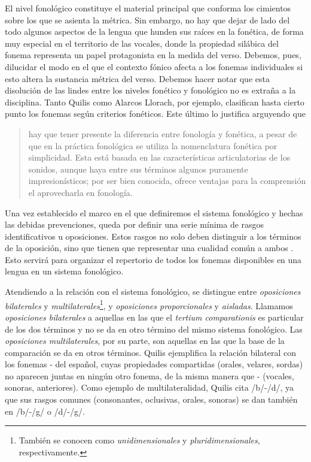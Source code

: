 El nivel fonológico constituye el material principal que conforma  los cimientos sobre los que se asienta la métrica. Sin embargo, no hay que dejar de lado del todo algunos aspectos de la lengua que hunden sus raíces en la fonética, de forma muy especial en el territorio de las vocales, donde la propiedad silábica del fonema representa un papel protagonista en la medida del verso. Debemos, pues, dilucidar el modo en el que el contexto fónico afecta a los fonemas individuales si esto altera la sustancia métrica del verso. Debemos hacer notar que esta disolución de las lindes entre los niveles fonético y fonológico no es extraña a la disciplina. Tanto Quilis \parencite*{quilis2019} como Alarcos Llorach, por ejemplo, clasifican hasta cierto punto los fonemas según criterios fonéticos.  Este último lo justifica arguyendo que \blockquote[{\cite[54]{alarcos1964}}]{hay que tener presente la diferencia entre fonología y fonética, a pesar de que en la práctica fonológica se utiliza la nomenclatura fonética por simplicidad. Esta está basada en las características articulatorias de los sonidos, aunque haya entre sus términos algunos puramente impresionísticos; por ser bien conocida, ofrece ventajas para la comprensión el aprovecharla en fonología.}

Una vez establecido el marco en el que definiremos el sistema fonológico y hechas las debidas prevenciones, queda por definir una serie mínima de rasgos identificativos u oposiciones. Estos rasgos no solo deben distinguir a los términos de la oposición, sino que tienen que representar una cualidad común a ambos \parencite[68-87]{trubetzkoy1969}. Esto servirá para organizar el repertorio de todos los fonemas disponibles en una lengua en un sistema fonológico.

Atendiendo a la relación con el sistema fonológico, se distingue entre \textit{oposiciones bilaterales} y \textit{multilaterales}\footnote{También se conocen como \textit{unidimensionales} y \textit{pluridimensionales}, respectivamente.}, y \textit{oposiciones proporcionales} y \textit{aisladas}. Llamamos \textit{oposiciones bilaterales} a aquellas en las que el \textit{tertium comparationis} es particular de los dos términos y no se da en otro término del mismo sistema fonológico. Las \textit{oposiciones multilaterales}, por su parte, son aquellas en las que la base de la comparación se da en otros términos. Quilis \parencite*[36]{quilis2019} ejemplifica la relación bilateral con los fonemas - del español, cuyas propiedades compartidas (orales, velares, sordas) no aparecen juntas en ningún otro fonema, de la misma manera que - (vocales, sonoras, anteriores). Como ejemplo de multilateralidad, Quilis cita /b/-/d/, ya que sus rasgos comunes (consonantes, oclusivas, orales, sonoras) se dan también en /b/-/g/ o /d/-/g/.


